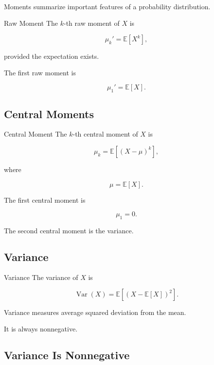 Moments summarize important features of a probability distribution.

\begin{definitionbox}{Raw Moment}
The \(k\)-th raw moment of \(X\) is

\[
\boxed{
\mu_k'
=
\mathbb{E}[X^k],
}
\]

provided the expectation exists.
\end{definitionbox}

The first raw moment is

\[
\boxed{
\mu_1'
=
\mathbb{E}[X].
}
\]

\subsection{Central Moments}
\label{subsec:central-moments}

\begin{definitionbox}{Central Moment}
The \(k\)-th central moment of \(X\) is

\[
\boxed{
\mu_k
=
\mathbb{E}
\left[
(X-\mu)^k
\right],
}
\]

where

\[
\mu=\mathbb{E}[X].
\]
\end{definitionbox}

The first central moment is

\[
\boxed{
\mu_1=0.
}
\]

The second central moment is the variance.

\subsection{Variance}
\label{subsec:variance}

\begin{definitionbox}{Variance}
The variance of \(X\) is

\[
\boxed{
\operatorname{Var}(X)
=
\mathbb{E}
\left[
(X-\mathbb{E}[X])^2
\right].
}
\]
\end{definitionbox}

Variance measures average squared deviation from the mean.

It is always nonnegative.

\subsection{Variance Is Nonnegative}
\label{subsec:variance-nonnegative}

